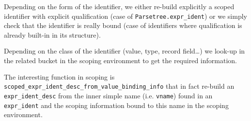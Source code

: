 Depending on the form of the identifier, we either re-build explicitly
a scoped identifier with explicit qualification (case of
{\tt Parsetree.expr\_ident}) or we simply check that the identifier is
really bound (case of identifiers where qualification is already
built-in in its structure).

Depending on the class of the identifier (value, type, record
field\ldots) we look-up in the related bucket in the scoping
environment to get the required information.

The interesting function in scoping is
{\tt scoped\_expr\_ident\_desc\_from\_value\_binding\_info} that in
fact re-build an {\tt expr\_ident\_desc} from the inner simple name (i.e.
{\tt vname}) found in an {\tt expr\_ident} and the scoping
information bound to this name in the scoping environment.